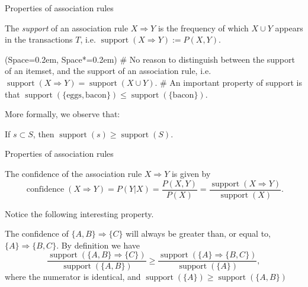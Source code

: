 \documentclass[12pt, aspectratio=1610]{beamer}
\newcommand{\listSpace}{0.2em}
\theoremstyle{plain}
\begin{document}
\begin{frame}[fragile]{Properties of association rules}
	\begin{definition}[Support]
		The \emph{support} of an association rule $X \Rightarrow Y$ is the frequency of which $X \cup Y$ appears in the transactions $T$, i.e. $ \operatorname{support}(X \Rightarrow Y) := P(X, Y)$.
	\end{definition}
	
	\begin{easylist}[itemize]
		\ListProperties(Space=\listSpace, Space*=\listSpace)
		# No reason to distinguish between the support of an itemset, and the support of an association rule, i.e. $\operatorname{support}(X \Rightarrow Y) = \operatorname{support}(X \cup Y)$.
		# An important property of support is that $\operatorname{support}(\{ \text{eggs}, \text{bacon} \}) \leq \operatorname{support}(\{ \text{bacon} \})$.
		
	\end{easylist}
	\vspace*{1em}
	More formally, we observe that:
	\begin{theorem}
		If $s \subset S$, then $\operatorname{support}(s) \geq \operatorname{support}(S)$.
	\end{theorem}

\end{frame}


\begin{frame}[fragile]{Properties of association rules}
	\small 
	\begin{definition}[Confidence]
		The confidence of the association rule $X \Rightarrow Y$ is given by 
		\begin{equation*}
		\operatorname{confidence}(X \Rightarrow Y) = P(Y | X) = \frac{P(X, Y) }{P(X) } = \frac{\operatorname{support}(X \Rightarrow Y)}{\operatorname{support}(X)}.
		\end{equation*}
	\end{definition}
	
	Notice the following interesting property.
	\begin{example}
		The confidence of $\{A, B\} \Rightarrow \{C\}$ will always be greater than, or equal to, $\{A\} \Rightarrow \{B, C\}$.
		By definition we have
		\begin{equation*}
		\frac{\operatorname{support}(\{A, B\} \Rightarrow \{C\})}{\operatorname{support}(\{A, B\})}
		\geq 
		\frac{\operatorname{support}(\{A\} \Rightarrow \{B, C\})}{\operatorname{support}(\{A\})},
		\end{equation*}
		where the numerator is identical, and $\operatorname{support}(\{A\}) \geq \operatorname{support}(\{A, B\})$  
	\end{example}
	\normalsize
	
\end{frame}
\end{document}
